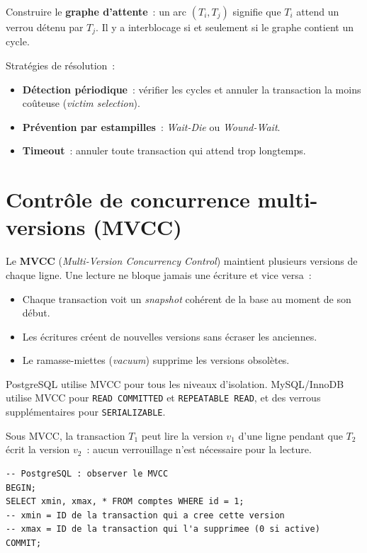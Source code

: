 \begin{proposition}
Construire le \textbf{graphe d'attente}~: un arc $(T_i, T_j)$ signifie que
$T_i$ attend un verrou d\'etenu par $T_j$. Il y a interblocage si et
seulement si le graphe contient un cycle.
\end{proposition}

Strat\'egies de r\'esolution~:
\begin{itemize}
  \item \textbf{D\'etection p\'eriodique}~: v\'erifier les cycles et annuler
        la transaction la moins co\^uteuse (\emph{victim selection}).
  \item \textbf{Pr\'evention par estampilles}~: \emph{Wait-Die} ou
        \emph{Wound-Wait}.
  \item \textbf{Timeout}~: annuler toute transaction qui attend trop longtemps.
\end{itemize}

\section{Contr\^ole de concurrence multi-versions (MVCC)}

\begin{definition}[MVCC]
Le \textbf{MVCC} (\emph{Multi-Version Concurrency Control}) maintient
plusieurs versions de chaque ligne. Une lecture ne bloque jamais une
\'ecriture et vice versa~:
\begin{itemize}
  \item Chaque transaction voit un \emph{snapshot} coh\'erent de la base
        au moment de son d\'ebut.
  \item Les \'ecritures cr\'eent de nouvelles versions sans \'ecraser les anciennes.
  \item Le ramasse-miettes (\emph{vacuum}) supprime les versions obsol\`etes.
\end{itemize}
\end{definition}

\begin{remarque}
PostgreSQL utilise MVCC pour tous les niveaux d'isolation. MySQL/InnoDB
utilise MVCC pour \texttt{READ COMMITTED} et \texttt{REPEATABLE READ},
et des verrous suppl\'ementaires pour \texttt{SERIALIZABLE}.
\end{remarque}

\begin{exemple}
Sous MVCC, la transaction $T_1$ peut lire la version $v_1$ d'une ligne
pendant que $T_2$ \'ecrit la version $v_2$~: aucun verrouillage n'est
n\'ecessaire pour la lecture.
\begin{verbatim}
-- PostgreSQL : observer le MVCC
BEGIN;
SELECT xmin, xmax, * FROM comptes WHERE id = 1;
-- xmin = ID de la transaction qui a cree cette version
-- xmax = ID de la transaction qui l'a supprimee (0 si active)
COMMIT;
\end{verbatim}
\end{exemple}

